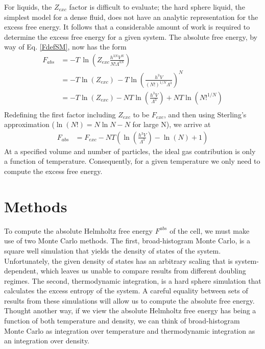 \documentclass[12pt]{article}
\newcommand{\ignore}[1]{}
\begin{document}
For liquids, the $Z_{exc}$ factor is difficult to evaluate; the hard sphere liquid, the simplest model for a dense fluid, does not have an analytic representation for the excess free energy. It follows that a considerable amount of work is required to determine the excess free energy for a given system. The absolute free energy, by way of Eq. \ref{FdefSM}, now has the form
\begin{align}
    F_{abs} &= -T\,\ln\left(Z_{exc} \frac{h^{3N} V^N}{N!\Lambda^{3N}}\right)\\
    &= -T\ln\left(Z_{exc}\right)\, -T\ln\left(\frac{h^3 V}{(N!)^{1/N}\Lambda^3} \right)^N\\
    &= -T\ln\left(Z_{exc}\right) - NT\ln\left(\frac{h^3 V}{\Lambda^3}\right) + NT\ln\left(N!^{1/N}\right)\\     
\end{align}
Redefining the first factor including $Z_{exc}$ to be $F_{exc}$, and then using Sterling's approximation ($\ln(N!) = N\ln N - N$ for large N), we arrive at \ignore{\textcolor{red}{BRENDEN FIX: $N\ln N - N$, plus I think we may want to add to the excess free energy (probably to the excess HS entropy?) the difference?}}
\begin{align}
    F_{abs} &= F_{exc} - NT\left(\ln\left(\frac{h^3 V}{\Lambda^3}\right) - \ln\left(N\right) + 1\right)
\end{align}
At a specified volume and number of particles, the ideal gas contribution is only a function of temperature. Consequently, for a given temperature we only need to compute the excess free energy.

\section{Methods}
To compute the absolute Helmholtz free energy $F^{abs}$ of the cell, we must make use of two Monte Carlo methods. The first, broad-histogram Monte Carlo, is a square well simulation that yields the density of states of the system. Unfortunately, the given density of states has an arbitrary scaling that is system-dependent, which leaves us unable to compare results from different doubling regimes. The second, thermodynamic integration, is a hard sphere simulation that calculates the excess entropy of the system. A careful equality between sets of results from these simulations will allow us to compute the absolute free energy. Thought another way, if we view the absolute Helmholtz free energy has being a function of both temperature and density, we can think of broad-histogram Monte Carlo as integration over temperature and thermodynamic integration as an integration over density.
\end{document}
